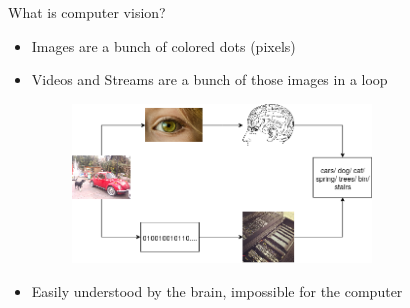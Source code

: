 \begin{frame}{What is computer vision?}
    \begin{itemize}
        \item Images are a bunch of colored dots (pixels)
        \item Videos and Streams are a bunch of those images in a loop
        \begin{figure}
            \begin{center}
                \includegraphics[width=0.75\textwidth]{images/Recoginition_Process.png}
            \end{center}
        \end{figure}
        \item Easily understood by the brain, impossible for the computer 
    \end{itemize}
\end{frame}
